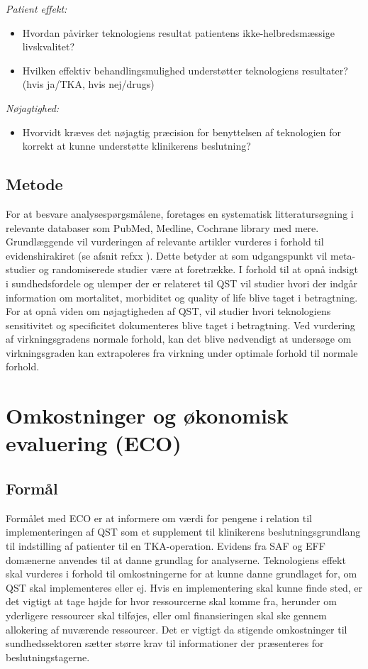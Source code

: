 \textit{Patient effekt:}
\begin{itemize}
	\item Hvordan påvirker teknologiens resultat patientens ikke-helbredsmæssige livskvalitet? %
	\item Hvilken effektiv behandlingsmulighed understøtter teknologiens resultater? (hvis ja/TKA, hvis nej/drugs) %
\end{itemize}
\textit{Nøjagtighed:}
\begin{itemize}
\item Hvorvidt kræves det nøjagtig præcision for benyttelsen af teknologien for korrekt at kunne understøtte klinikerens beslutning? %
\end{itemize}

\subsection{Metode \citep{HTAcore}}
For at besvare analysespørgsmålene, foretages en systematisk litteratursøgning i relevante databaser som PubMed, Medline, Cochrane library med mere. Grundlæggende vil vurderingen af relevante artikler vurderes i forhold til evidenshirakiret (se afsnit ref{xx} ). Dette betyder at som udgangspunkt vil meta-studier og randomiserede studier være at foretrække. I forhold til at opnå indsigt i sundhedsfordele og ulemper der er relateret til QST vil studier hvori der indgår information om mortalitet, morbiditet og quality of life blive taget i betragtning. For at opnå viden om nøjagtigheden af QST, vil studier hvori teknologiens sensitivitet og specificitet dokumenteres blive taget i betragtning. Ved vurdering af virkningsgradens normale forhold, kan det blive nødvendigt at undersøge om virkningsgraden kan extrapoleres fra virkning under optimale forhold til normale forhold.

\section{Omkostninger og økonomisk evaluering (ECO)}
\subsection{Formål}
Formålet med ECO er at informere om værdi for pengene i relation til implementeringen af QST som et supplement til klinikerens beslutningsgrundlang til indstilling af patienter til en TKA-operation. Evidens fra SAF og EFF domænerne anvendes til at danne grundlag for analyserne. Teknologiens effekt skal vurderes i forhold til omkostningerne for at kunne danne grundlaget for, om QST skal implementeres eller ej. Hvis en implementering skal kunne finde sted, er det vigtigt at tage højde for hvor ressourcerne skal komme fra, herunder om yderligere ressourcer skal tilføjes, eller oml finansieringen skal ske gennem allokering af nuværende ressourcer. Det er vigtigt da stigende omkostninger til sundhedssektoren sætter større krav til informationer der præsenteres for beslutningstagerne.
